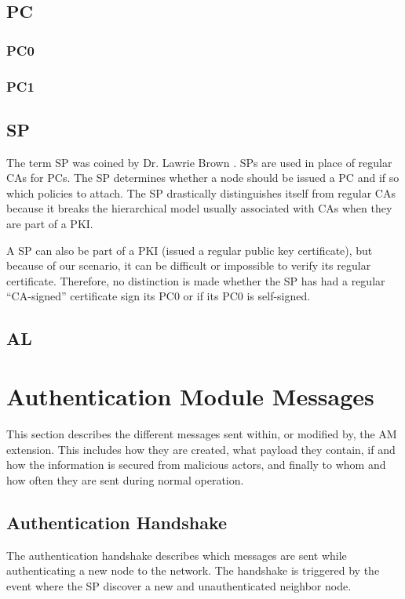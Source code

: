 \subsection{\acf{PC}}


\subsubsection*{\acf{PC0}}

\subsubsection*{\acf{PC1}}

\subsection{\acf{SP}}
The term \acl{SP} was coined by Dr. Lawrie Brown \cite{lawrie:technotes}.
\acp{SP} are used in place of regular \acp{CA} for \acp{PC}. The \ac{SP}
determines whether a node should be issued a \ac{PC} and if so which policies to
attach. The \ac{SP} drastically distinguishes itself from regular \acp{CA}
because it breaks the hierarchical model usually associated with \acp{CA} when
they are part of a \ac{PKI}.

A \ac{SP} can also be part of a \ac{PKI} (issued a regular public key
certificate), but because of our scenario, it can be difficult or impossible to
verify its regular certificate. Therefore, no distinction is made whether the
\ac{SP} has had a regular ``\ac{CA}-signed'' certificate sign its \ac{PC0} or if
its \ac{PC0} is self-signed.


\subsection{\acf{AL}}


\section{Authentication Module Messages}
This section describes the different messages sent within, or modified by, the
\ac{AM} extension. This includes how they are created, what payload they
contain, if and how the information is secured from malicious actors, and
finally to whom and how often they are sent during normal operation.

\subsection{Authentication Handshake}
The authentication handshake describes which messages are sent while
authenticating a new node to the network. The handshake is triggered by the
event where the \ac{SP} discover a new and unauthenticated neighbor node.

